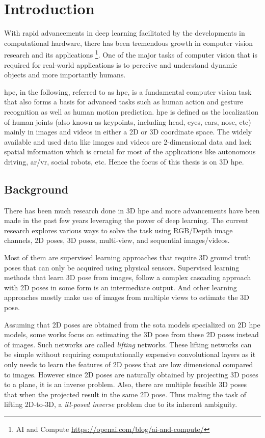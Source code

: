 \chapter{Introduction}
\label{chap:introduction}
With rapid advancements in deep learning facilitated by the developments in computational hardware, there has been tremendous growth in computer vision research and its applications \footnote{AI and Compute  \url{https://openai.com/blog/ai-and-compute/}}. One of the major tasks of computer vision that is required for real-world applications is to perceive and understand dynamic objects and more importantly humans.  %

\acl{hpe}, in the following, referred to as \acs{hpe}, is a fundamental computer vision task that also forms a basis for advanced tasks such as human action and gesture recognition as well as human motion prediction. \ac{hpe} is defined as the localization of human joints (also known as keypoints, including head, eyes, ears, nose, etc) mainly in images and videos in either a 2D or 3D coordinate space. The widely available and used data like images and videos are 2-dimensional data and lack spatial information which is crucial for most of the applications like autonomous driving, \ac{ar/vr}, social robots, etc. Hence the focus of this thesis is on 3D \ac{hpe}.

\section{Background}
\label{sec:background}

There has been much research done in 3D \ac{hpe} and more advancements have been made in the past few years leveraging the power of deep learning. The current research explores various ways to solve the task using RGB/Depth image channels, 2D poses, 3D poses, multi-view, and sequential images/videos. 

Most of them are supervised learning approaches that require 3D ground truth poses that can only be acquired using physical sensors. Supervised learning methods that learn 3D pose from images, follow a complex cascading approach with 2D poses in some form is an intermediate output. And other learning approaches mostly make use of images from multiple views to estimate the 3D pose. 

Assuming that 2D poses are obtained from the \ac{sota} models specialized on 2D \ac{hpe} models, some works focus on estimating the 3D pose from these 2D poses instead of images. Such networks are called \textit{lifting} networks. These lifting networks can be simple without requiring computationally expensive convolutional layers as it only needs to learn the features of 2D poses that are low dimensional compared to images. However since 2D poses are naturally obtained by projecting 3D poses to a plane, it is an inverse problem. Also, there are multiple feasible 3D poses that when the projected result in the same 2D pose. Thus making the task of lifting 2D-to-3D, a \textit{ill-posed inverse} problem due to its inherent ambiguity.

